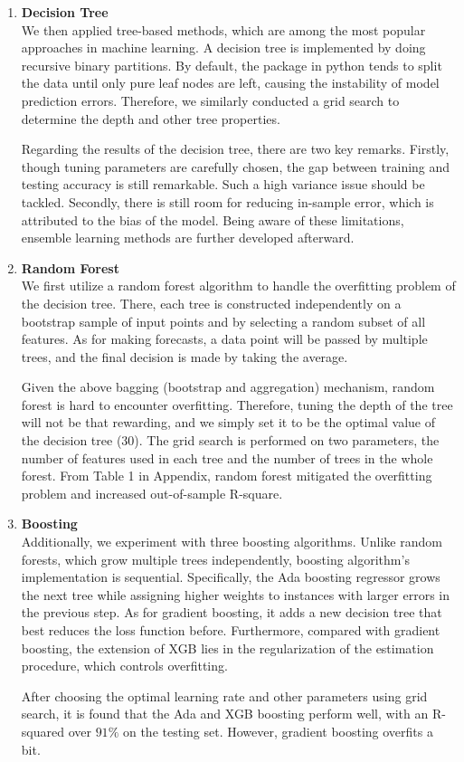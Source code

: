 \documentclass[11pt,a4paper]{article}
\begin{document}
\begin{enumerate}
        \item \textbf{Decision Tree}  \\
        We then applied tree-based methods, which are among the most popular approaches in machine learning. A decision tree is implemented by doing recursive binary partitions. By default, the package in python tends to split the data until only pure leaf nodes are left, causing the instability of model prediction errors. Therefore, we similarly conducted a grid search to determine the depth and other tree properties.
        
        Regarding the results of the decision tree, there are two key remarks. Firstly, though tuning parameters are carefully chosen, the gap between training and testing accuracy is still remarkable. Such a high variance issue should be tackled. Secondly, there is still room for reducing in-sample error, which is attributed to the bias of the model. Being aware of these limitations, ensemble learning methods are further developed afterward.
        \item \textbf{Random Forest} \\
       We first utilize a random forest algorithm to handle the overfitting problem of the decision tree. There, each tree is constructed independently on a bootstrap sample of input points and by selecting a random subset of all features. As for making forecasts, a data point will be passed by multiple trees, and the final decision is made by taking the average.
        
Given the above bagging (bootstrap and aggregation) mechanism, random forest is hard to encounter overfitting. Therefore, tuning the depth of the tree will not be that rewarding, and we simply set it to be the optimal value of the decision tree (30). The grid search is performed on two parameters, the number of features used in each tree and the number of trees in the whole forest. From Table 1 in Appendix, random forest mitigated the overfitting problem and increased out-of-sample R-square.
\item \textbf{Boosting} \\
Additionally, we experiment with three boosting algorithms. Unlike random forests, which grow multiple trees independently, boosting algorithm's implementation is sequential. Specifically, the Ada boosting regressor grows the next tree while assigning higher weights to instances with larger errors in the previous step. As for gradient boosting, it adds a new decision tree that best reduces the loss function before. Furthermore, compared with gradient boosting, the extension of XGB lies in the regularization of the estimation procedure, which controls overfitting. 

After choosing the optimal learning rate and other parameters using grid search, it is found that the Ada and XGB boosting perform well, with an R-squared over $91\%$ on the testing set. However, gradient boosting overfits a bit.
    \end{enumerate}
\end{document}
